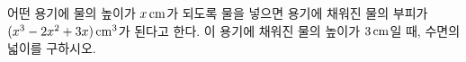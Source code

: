 어떤 용기에 물의 높이가 $x\mkern3mu \mathrm{cm}$가 되도록 물을 넣으면 용기에 채워진 물의 부피가 $(x^3-2x^2+3x)\mkern3mu \mathrm{cm}^3$가 된다고 한다. 이 용기에 채워진 물의 높이가 $3\mkern3mu \mathrm{cm}$일 때, 수면의 넓이를 구하시오.
